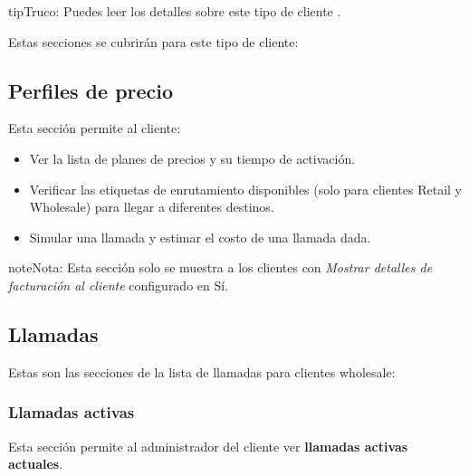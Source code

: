 \documentclass[letterpaper,10pt,spanish]{sphinxmanual}
\begin{document}
\begin{notice}{tip}{Truco:}
Puedes leer los detalles sobre este tipo de cliente {\hyperref[administration_portal/brand/clients/wholesale:wholesale\string-clients]{}}.
\end{notice}

Estas secciones se cubrirán para este tipo de cliente:


\subsection{Perfiles de precio}
\label{administration_portal/client/wholesale/rating_profiles:rating-profiles}\label{administration_portal/client/wholesale/rating_profiles::doc}
Esta sección permite al cliente:
\begin{itemize}
\item {} 
Ver la lista de planes de precios y su tiempo de activación.

\item {} 
Verificar las etiquetas de enrutamiento disponibles (solo para clientes Retail y Wholesale) para llegar a diferentes destinos.

\item {} 
Simular una llamada y estimar el costo de una llamada dada.

\end{itemize}

\begin{notice}{note}{Nota:}
Esta sección solo se muestra a los clientes con \emph{Mostrar detalles de facturación al cliente} configurado en Sí.
\end{notice}


\subsection{Llamadas}
\label{administration_portal/client/wholesale/calls/index::doc}\label{administration_portal/client/wholesale/calls/index:calls}
Estas son las secciones de la lista de llamadas para clientes wholesale:


\subsubsection{Llamadas activas}
\label{administration_portal/client/wholesale/calls/active_calls::doc}\label{administration_portal/client/wholesale/calls/active_calls:active-calls}
Esta sección permite al administrador del cliente ver \textbf{llamadas activas actuales}.
\end{document}
